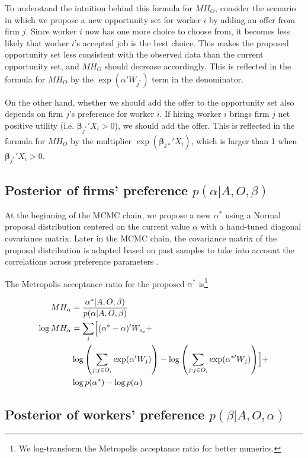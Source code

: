 To understand the intuition behind this formula for $MH_O$, consider the
scenario in which we propose a new opportunity set for worker $i$ by adding an
offer from firm $j$. Since worker $i$ now has one more choice to choose from, it
becomes less likely that worker $i$'s accepted job is the best choice. This
makes the proposed opportunity set less consistent with the observed data than
the current opportunity set, and $MH_O$ should decrease accordingly. This is
reflected in the formula for $MH_O$ by the $\exp(\alpha'W_{j^*})$ term in the
denominator.

On the other hand, whether we should add the offer to the opportunity set also
depends on firm $j$'s preference for worker $i$. If hiring worker $i$ brings firm
$j$ net positive utility (i.e. $\bm{\beta}_{j^*}'X_i > 0$), we should add the
offer. This is reflected in the formula for $MH_O$ by the multiplier
$\exp(\bm{\beta}_{j*}'X_i)$, which is larger than 1 when $\bm{\beta}_{j^*}'X_i >
0$.

\subsection{Posterior of firms' preference $p(\alpha|A, O, \beta)$}

At the beginning of the MCMC chain, we propose a new $\alpha^*$ using a Normal
proposal distribution centered on the current value $\alpha$ with a hand-tuned
diagonal covariance matrix. Later in the MCMC chain, the covariance matrix of
the proposal distribution is adapted based on past samples to take into account
the correlations across preference parameters \citep{Haario2001}.

The Metropolis acceptance ratio for the proposed $\alpha^*$ is\footnote{We
  log-transform the Metropolis acceptance ratio for better numerics.}

\begin{align}
  MH_\alpha &= \frac{\alpha^*|A, O, \beta)}{p(\alpha | A, O, \beta)} \\
  \log MH_\alpha &= \sum_i \Bigl[ (\alpha^* - \alpha)' W_{a_i} + \nonumber \\
                 & \log\left(\sum\limits_{j:j \in O_i} \exp(\alpha' W_j)\right) -
                   \log\left(\sum\limits_{j:j \in O_i} \exp(\alpha^{*\prime} W_j)\right) \Bigr] + \nonumber\\
                 & \log p(\alpha^*) - \log p(\alpha)
\end{align}

\subsection{Posterior of workers' preference $p(\beta|A, O, \alpha)$}

